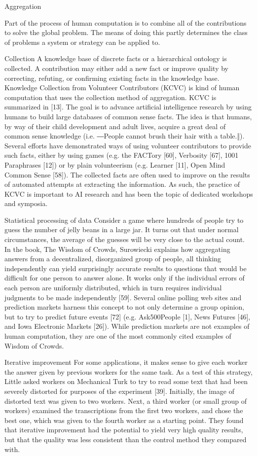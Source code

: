 \documentclass{acm_proc_article-sp} %
\begin{document}
Aggregation 

Part of the process of human computation is to combine all of the contributions to solve the global problem. The means of doing this partly determines the class of problems a system or strategy can be applied to.

Collection A knowledge base of discrete facts or a hierarchical ontology is collected. A contribution may either add a new fact or improve quality by correcting, refuting, or confirming existing facts in the knowledge base. Knowledge Collection from Volunteer Contributors (KCVC) is kind of human computation that uses the collection method of aggregation. KCVC is summarized in [13]. The goal is to advance artificial intelligence research by using humans to build large databases of common sense facts. The idea is that humans, by way of their child development and adult lives, acquire a great deal of common sense knowledge (i.e. ―People cannot brush their hair with a table.‖). Several efforts have demonstrated ways of using volunteer contributors to provide such facts, either by using games (e.g. the FACTory [60], Verbosity [67], 1001 Paraphrases [12]) or by plain volunteerism (e.g. Learner [11], Open Mind Common Sense [58]). The collected facts are often used to improve on the results of automated attempts at extracting the information.  As such, the practice of KCVC is important to AI research and has been the topic of dedicated workshops and symposia. 

Statistical processing of data Consider a game where hundreds of people try to guess the number of jelly beans in a large jar. It turns out that under normal circumstances, the average of the guesses will be very close to the actual count. In the book, The Wisdom of Crowds, Surowiecki explains how aggregating answers from a decentralized, disorganized group of people, all thinking independently can yield surprisingly accurate results to questions that would be difficult for one person to answer alone. It works only if the individual errors of each person are uniformly distributed, which in turn requires individual judgments to be made independently [59]. Several online polling web sites and prediction markets harness this concept to not only determine a group opinion, but to try to predict future events [72] (e.g. Ask500People [1], News Futures [46], and Iowa Electronic Markets [26]). While prediction markets are not examples of human computation, they are one of the most commonly cited examples of Wisdom of Crowds. 

Iterative improvement For some applications, it makes sense to give each worker the answer given by previous workers for the same task. As a test of this strategy, Little asked workers on Mechanical Turk to try to read some text that had been severely distorted for purposes of the experiment [39]. Initially, the image of distorted text was given to two workers. Next, a third worker (or small group of workers) examined the transcriptions from the first two workers, and chose the best one, which was given to the fourth worker as a starting point. They found that iterative improvement had the potential to yield very high quality results, but that the quality was less consistent than the control method they compared with. 
\end{document}
